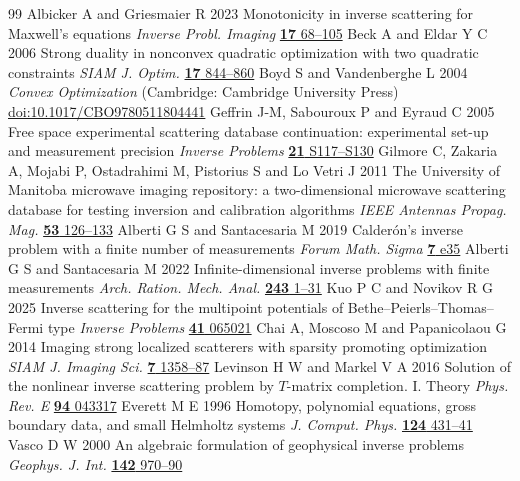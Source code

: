 \documentclass[anonymous,12pt]{iopjournal}
\theoremstyle{remark}\newtheorem{remark}[theorem]{Remark}
\numberwithin{equation}{section}
\begin{document}
\begin{thebibliography}{99}
 Albicker A and Griesmaier R 2023 Monotonicity in inverse scattering for Maxwell's equations \emph{Inverse Probl. Imaging} \href{https://doi.org/10.3934/ipi.2022032}{\textbf{17} 68--105}
 Beck A and Eldar Y C 2006 Strong duality in nonconvex quadratic optimization with two quadratic constraints \emph{SIAM J. Optim.} \href{https://doi.org/10.1137/050644471}{\textbf{17} 844--860}
 Boyd S and Vandenberghe L 2004 \emph{Convex Optimization} (Cambridge: Cambridge University Press) \href{https://doi.org/10.1017/CBO9780511804441}{doi:10.1017/CBO9780511804441}
 Geffrin J-M, Sabouroux P and Eyraud C 2005 Free space experimental scattering database continuation: experimental set-up and measurement precision \emph{Inverse Problems} \href{https://doi.org/10.1088/0266-5611/21/6/S09}{\textbf{21} S117--S130}
 Gilmore C, Zakaria A, Mojabi P, Ostadrahimi M, Pistorius S and Lo Vetri J 2011 The University of Manitoba microwave imaging repository: a two-dimensional microwave scattering database for testing inversion and calibration algorithms \emph{IEEE Antennas Propag. Mag.} \href{https://doi.org/10.1109/MAP.2011.6138442}{\textbf{53} 126--133}
Alberti G S and Santacesaria M 2019 Calder\'on's inverse problem with a finite number of measurements \emph{Forum Math. Sigma} \href{https://doi.org/10.1017/fms.2019.31}{\textbf{7} e35}
Alberti G S and Santacesaria M 2022 Infinite-dimensional inverse problems with finite measurements \emph{Arch. Ration. Mech. Anal.} \href{https://doi.org/10.1007/s00205-021-01718-4}{\textbf{243} 1--31}
Kuo P C and Novikov R G 2025 Inverse scattering for the multipoint potentials of Bethe--Peierls--Thomas--Fermi type \emph{Inverse Problems} \href{https://doi.org/10.1088/1361-6420/ade282}{\textbf{41} 065021}
Chai A, Moscoso M and Papanicolaou G 2014 Imaging strong localized scatterers with sparsity promoting optimization \emph{SIAM J. Imaging Sci.} \href{https://doi.org/10.1137/130943200}{\textbf{7} 1358--87}
Levinson H W and Markel V A 2016 Solution of the nonlinear inverse scattering problem by \(T\)-matrix completion. I. Theory \emph{Phys. Rev. E} \href{https://doi.org/10.1103/PhysRevE.94.043317}{\textbf{94} 043317}
Everett M E 1996 Homotopy, polynomial equations, gross boundary data, and small Helmholtz systems \emph{J. Comput. Phys.} \href{https://doi.org/10.1006/jcph.1996.0070}{\textbf{124} 431--41}
Vasco D W 2000 An algebraic formulation of geophysical inverse problems \emph{Geophys. J. Int.} \href{https://doi.org/10.1046/j.1365-246x.2000.00188.x}{\textbf{142} 970--90}

\end{thebibliography}
\end{document}
